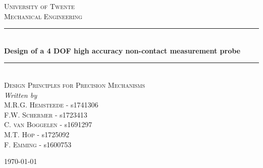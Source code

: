 \documentclass[11pt,a4paper]{article}
\begin{document}
\begin{titlepage}
	\newcommand{\HRule}{\rule{\linewidth}{0.5mm}} 
	\center	
	\textsc{\LARGE University of Twente}\\[1cm] 
	\textsc{\large Mechanical Engineering}\\[0.5cm] \HRule\\[0.4cm]
	{\huge\bfseries Design of a 4 DOF high accuracy non-contact measurement probe}\\[0.4cm] 
	\HRule\\[1.5cm]
		\textsc{\large Design Principles for Precision Mechanisms }\\[0.5cm] 
    
\noindent \textit{Written by} \\
M.R.G. \textsc{Hemsteede} - s1741306\\
F.W. \textsc{Schermer} - s1723413 \\
C. \textsc{van Boggelen} - s1691297 \\
M.T. \textsc{Hop} - s1725092 \\
F. \textsc{Emming} - s1600753

\vfill\vfill\vfill
	{\large\today} \vfill 
	\end{titlepage}

\tableofcontents
\setcounter{page}{0}
\newpage

\newpage

\newpage

\newpage

\newpage

\newpage

\newpage

\newpage

\newpage
{}

 

\newpage
\begin{appendices} 

\end{appendices}
\end{document}
